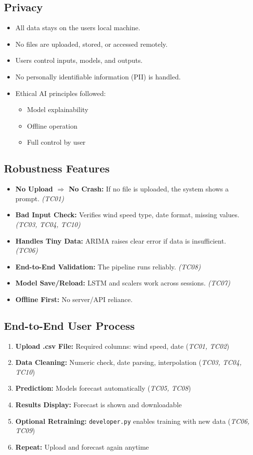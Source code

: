 \subsection{Privacy}
\begin{itemize}
	\item All data stays on the user\textquotesingle s local machine.
	\item No files are uploaded, stored, or accessed remotely.
	\item Users control inputs, models, and outputs.
	\item No personally identifiable information (PII) is handled.
	\item Ethical AI principles followed:
	\begin{itemize}
		\item Model explainability
		\item Offline operation
		\item Full control by user
	\end{itemize}
\end{itemize}

\subsection{Robustness Features}
\begin{itemize}
	\item \textbf{No Upload \ensuremath{\Rightarrow} No Crash:} If no file is uploaded, the system shows a prompt. \textit{(TC01)}
	\item \textbf{Bad Input Check:} Verifies wind speed type, date format, missing values. \textit{(TC03, TC04, TC10)}
	\item \textbf{Handles Tiny Data:} ARIMA raises clear error if data is insufficient. \textit{(TC06)}
	\item \textbf{End-to-End Validation:} The pipeline runs reliably. \textit{(TC08)}
	\item \textbf{Model Save/Reload:} LSTM and scalers work across sessions. \textit{(TC07)}
	\item \textbf{Offline First:} No server/API reliance.
\end{itemize}

\subsection{End-to-End User Process}
\begin{enumerate}
	\item \textbf{Upload .csv File:} Required columns: wind speed, date \hfill (\textit{TC01, TC02})
	\item \textbf{Data Cleaning:} Numeric check, date parsing, interpolation \hfill (\textit{TC03, TC04, TC10})
	\item \textbf{Prediction:} Models forecast automatically \hfill (\textit{TC05, TC08})
	\item \textbf{Results Display:} Forecast is shown and downloadable
	\item \textbf{Optional Retraining:} \texttt{developer.py} enables training with new data \hfill (\textit{TC06, TC09})
	\item \textbf{Repeat:} Upload and forecast again anytime
\end{enumerate}
